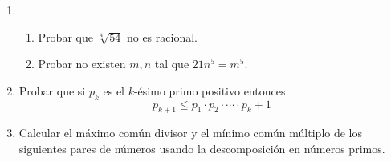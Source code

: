 \documentclass[a4paper,12pt,twoside,spanish,reqno]{amsbook}
\numberwithin{equation}{section}
\begin{document}
\begin{enumerate}
\item  
\begin{enumerate}
    \item Probar  que $\sqrt[4]{54}$ no es racional. 
    \item Probar no existen $m, n$ tal que $21 n^5 = m^5$. 
\end{enumerate}

\item Probar que si $p_k$ es el $k$-ésimo primo positivo entonces
$$p_{k+1}\leq p_1\cdot p_2\cdot \cdots \cdot p_k+1$$



\item Calcular el máximo común divisor y el mínimo común múltiplo de los siguientes pares de números usando la descomposición en números primos. 


\end{enumerate}
\end{document}
